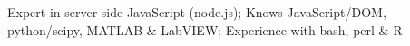 \item Expert in server-side JavaScript (node.js); Knows JavaScript/DOM, python/scipy, MATLAB \& LabVIEW; Experience with bash, perl \& R
